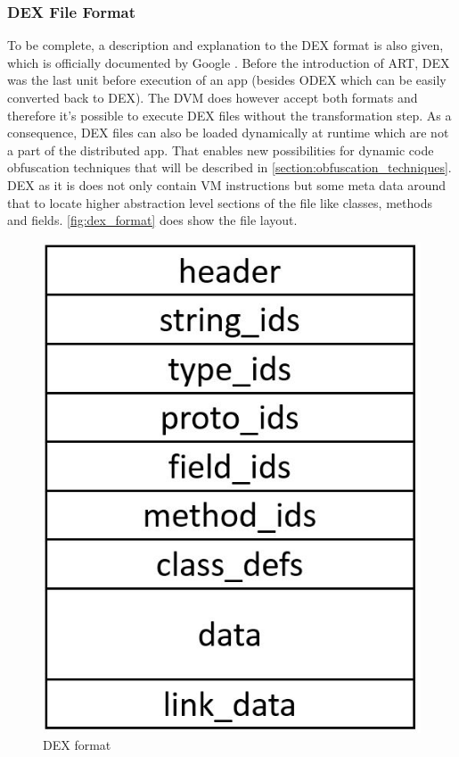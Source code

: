\subsubsection{DEX File Format}
\label{section:dex_file_format}
To be complete, a description and explanation to the DEX format is also given,
which is officially documented by Google \parencite{dex}.
Before the introduction of ART, DEX was the last unit before
execution of an app (besides ODEX which can be easily converted back to DEX). The DVM does however accept
both formats and therefore it's possible to execute
DEX files without the transformation step. As a consequence,
DEX files can also be loaded dynamically at runtime which are not a part
of the distributed app. That enables new possibilities for dynamic code obfuscation techniques that will be described in \autoref{section:obfuscation_techniques}. DEX as it is does not only contain
VM instructions but some meta data around that to locate
higher abstraction level sections of the file like classes,
methods and fields.
\autoref{fig:dex_format} does show the file layout.
\begin{figure}[htb]
  \centering
  \includegraphics[scale=0.3]{figures/dex_format}
  \caption[DEX format]{DEX format}
  \label{fig:dex_format}
\end{figure}
